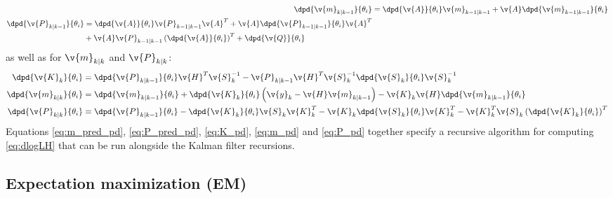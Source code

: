 \begin{align}
	\dpd{\v{m}_{k|k-1}}{\theta_i}&=\dpd{\v{A}}{\theta_i}\v{m}_{k-1|k-1}+\v{A}\dpd{\v{m}_{k-1|k-1}}{\theta_i} \label{eq:m_pred_pd}\\
	\begin{split}
	\dpd{\v{P}_{k|k-1}}{\theta_i}&=\dpd{\v{A}}{\theta_i}\v{P}_{k-1|k-1}\v{A}^T+\v{A}\dpd{\v{P}_{k-1|k-1}}{\theta_i}\v{A}^T\\
	&+\v{A}\v{P}_{k-1|k-1}\left(\dpd{\v{A}}{\theta_i}\right)^T+\dpd{\v{Q}}{\theta_i} \label{eq:P_pred_pd}
	\end{split}
\end{align}
as well as for $\v{m}_{k|k}$ and $\v{P}_{k|k}$:
\begin{align}
	\dpd{\v{K}_k}{\theta_i}&=\dpd{\v{P}_{k|k-1}}{\theta_i}\v{H}^T\v{S}_{k}^{-1}-\v{P}_{k|k-1}\v{H}^T\v{S}_{k}^{-1}\dpd{\v{S}_k}{\theta_i}\v{S}_{k}^{-1}
	\label{eq:K_pd}\\
	\dpd{\v{m}_{k|k}}{\theta_i}&=\dpd{\v{m}_{k|k-1}}{\theta_i}+\dpd{\v{K}_k}{\theta_i}\left(\v{y}_k-\v{H}\v{m}_{k|k-1}\right)-\v{K}_k\v{H}\dpd{\v{m}_{k|k-1}}{\theta_i}
	\label{eq:m_pd}\\
	\dpd{\v{P}_{k|k}}{\theta_i}&=\dpd{\v{P}_{k|k-1}}{\theta_i}-\dpd{\v{K}_k}{\theta_i}\v{S}_{k}\v{K}_{k}^T-\v{K}_{k}\dpd{\v{S}_k}{\theta_i}\v{K}_{k}^T-\v{K}_{k}^T\v{S}_{k}\left(\dpd{\v{K}_k}{\theta_i}\right)^T
	\label{eq:P_pd}
	\end{align}
Equations \eqref{eq:m_pred_pd}, \eqref{eq:P_pred_pd}, \eqref{eq:K_pd}, \eqref{eq:m_pd} and \eqref{eq:P_pd} together specify
a recursive algorithm for computing \eqref{eq:dlogLH} that can be run alongside the Kalman filter recursions.  

\subsection{Expectation maximization (EM)}%

